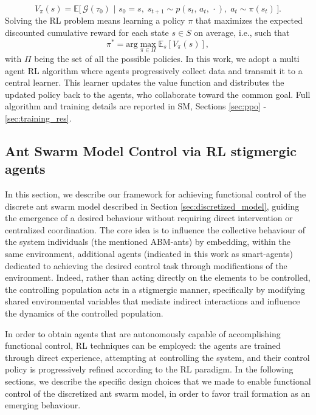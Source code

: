 \documentclass[openacc]{rsproca_new}
\begin{document}
\begin{equation}
\label{eq:2.2}
     V_{\pi}(s) = \mathbb{E}\Big[ \,  \mathcal{G}(\tau_0) \,\, \vert \,\, s_0 = s ,\; s_{t+1} \sim p(s_t, \, a_t, \, \cdot ) ,\;  a_t \sim \pi(s_t) \, \Big].
\end{equation}
Solving the RL problem means learning a policy $\pi$ that maximizes the expected discounted cumulative reward for each state $s \in S$ on average, i.e., such that 
\begin{equation}
\pi^{*} = \text{arg}\max_{\pi \in \Pi} \mathbb{E}_{s}[V_{\pi}(s)],
\label{eq:RL-pb}
\end{equation}
with $\Pi$ being the set of all the possible policies.
In this work, we adopt a multi agent RL algorithm where agents progressively collect data and transmit it to a central learner. This learner updates the value function and distributes the updated policy back to the agents, who collaborate toward the common goal.
Full algorithm and training details are reported in SM, Sections \ref{sec:ppo} - \ref{sec:training_res}.


\subsection{Ant Swarm Model Control via RL stigmergic agents}
\label{sec:RLDesign}
In this section, we describe our framework for achieving functional control of the discrete ant swarm model described in Section \ref{sec:discretized_model}, guiding the emergence of a desired behaviour without requiring direct intervention or centralized coordination. The core idea is to influence the collective behaviour of the system individuals (the mentioned ABM-ants) by embedding, within the same environment, additional agents (indicated in this work as smart-agents) dedicated to achieving the desired control task through modifications of the environment. Indeed, rather than acting directly on the elements to be controlled, the controlling population acts in a stigmergic manner, specifically by modifying shared environmental variables that mediate indirect interactions and influence the dynamics of the controlled population. 

In order to obtain agents that are autonomously capable of accomplishing functional control, RL techniques can be employed: the agents are trained through direct experience, attempting at controlling the system, and their control policy is progressively refined according to the RL paradigm. In the following sections, we describe the specific design choices that we made to enable functional control of the discretized ant swarm model, in order to favor trail formation as an emerging behaviour. 
\end{document}
